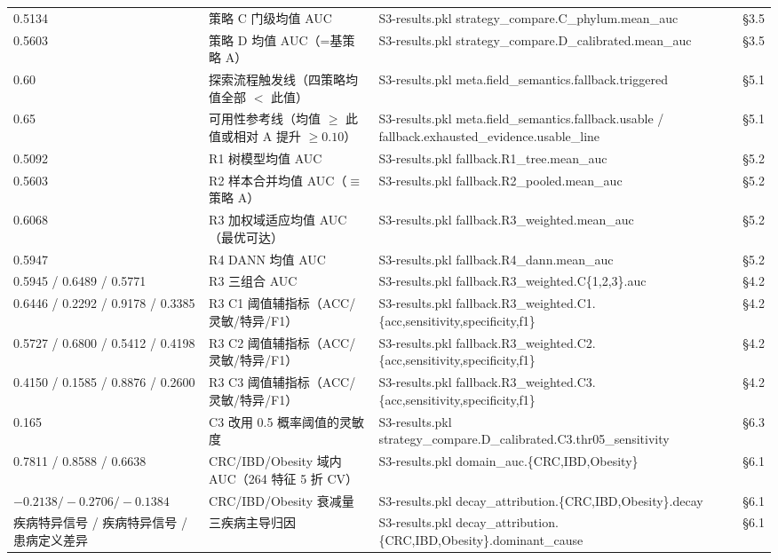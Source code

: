 \documentclass{article}   %
\begin{document}
\begin{center}
\begin{tabular}{llll}
0.5134 & 策略 C 门级均值 AUC & S3-results.pkl strategy\_compare.C\_phylum.mean\_auc & §3.5 \\
0.5603 & 策略 D 均值 AUC（=基策略 A） & S3-results.pkl strategy\_compare.D\_calibrated.mean\_auc & §3.5 \\
0.60 & 探索流程触发线（四策略均值全部 $<$ 此值） & S3-results.pkl meta.field\_semantics.fallback.triggered & §5.1 \\
0.65 & 可用性参考线（均值 $\ge$ 此值或相对 A 提升 $\ge 0.10$） & S3-results.pkl meta.field\_semantics.fallback.usable / fallback.exhausted\_evidence.usable\_line & §5.1 \\
0.5092 & R1 树模型均值 AUC & S3-results.pkl fallback.R1\_tree.mean\_auc & §5.2 \\
0.5603 & R2 样本合并均值 AUC（$\equiv$ 策略 A） & S3-results.pkl fallback.R2\_pooled.mean\_auc & §5.2 \\
0.6068 & R3 加权域适应均值 AUC（最优可达） & S3-results.pkl fallback.R3\_weighted.mean\_auc & §5.2 \\
0.5947 & R4 DANN 均值 AUC & S3-results.pkl fallback.R4\_dann.mean\_auc & §5.2 \\
0.5945 / 0.6489 / 0.5771 & R3 三组合 AUC & S3-results.pkl fallback.R3\_weighted.C\{1,2,3\}.auc & §4.2 \\
0.6446 / 0.2292 / 0.9178 / 0.3385 & R3 C1 阈值辅指标（ACC/灵敏/特异/F1） & S3-results.pkl fallback.R3\_weighted.C1.\{acc,sensitivity,specificity,f1\} & §4.2 \\
0.5727 / 0.6800 / 0.5412 / 0.4198 & R3 C2 阈值辅指标（ACC/灵敏/特异/F1） & S3-results.pkl fallback.R3\_weighted.C2.\{acc,sensitivity,specificity,f1\} & §4.2 \\
0.4150 / 0.1585 / 0.8876 / 0.2600 & R3 C3 阈值辅指标（ACC/灵敏/特异/F1） & S3-results.pkl fallback.R3\_weighted.C3.\{acc,sensitivity,specificity,f1\} & §4.2 \\
0.165 & C3 改用 0.5 概率阈值的灵敏度 & S3-results.pkl strategy\_compare.D\_calibrated.C3.thr05\_sensitivity & §6.3 \\
0.7811 / 0.8588 / 0.6638 & CRC/IBD/Obesity 域内 AUC（264 特征 5 折 CV） & S3-results.pkl domain\_auc.\{CRC,IBD,Obesity\} & §6.1 \\
$-0.2138 / -0.2706 / -0.1384$ & CRC/IBD/Obesity 衰减量 & S3-results.pkl decay\_attribution.\{CRC,IBD,Obesity\}.decay & §6.1 \\
疾病特异信号 / 疾病特异信号 / 患病定义差异 & 三疾病主导归因 & S3-results.pkl decay\_attribution.\{CRC,IBD,Obesity\}.dominant\_cause & §6.1 \\

\end{tabular}
\end{center}
\end{document}
